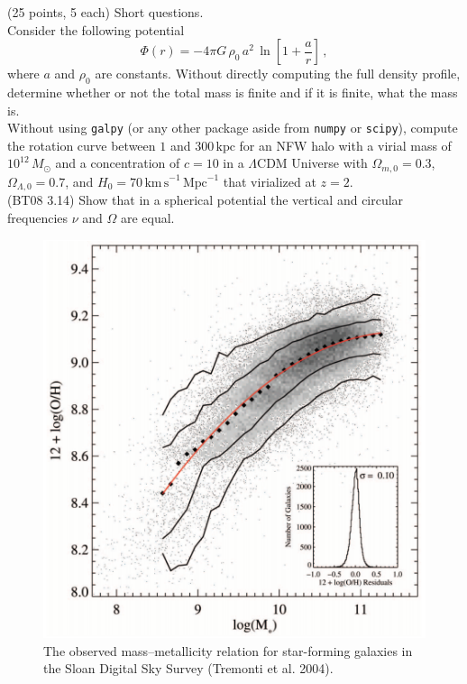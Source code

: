 \documentclass[12pt]{article}
\begin{document}
 (25 points, 5 each) Short questions.\\

 Consider the following potential
\begin{equation}
  \Phi(r) = -4\pi G\,\rho_0\,a^2\,\ln\left[1+\frac{a}{r}\right]\,,
\end{equation}
where $a$ and $\rho_0$ are constants. Without directly computing the
full density profile, determine whether or not the total mass is
finite and if it is finite, what the mass is.\\

 Without using \texttt{galpy} (or any other package
aside from \texttt{numpy} or \texttt{scipy}), compute the rotation
curve between $1$ and $300\,\mathrm{kpc}$ for an NFW halo with a
virial mass of $10^{12}\,M_\odot$ and a concentration of $c=10$ in a
$\Lambda$CDM Universe with $\Omega_{m,0} = 0.3$, $\Omega_{\Lambda,0}
= 0.7$, and $H_0 = 70\,\mathrm{km\,s}^{-1}\,\mathrm{Mpc}^{-1}$ that
virialized at $z=2$.\\

 (BT08 3.14) Show that in a spherical potential the
vertical and circular frequencies $\nu$ and $\Omega$ are equal.\\

\begin{figure}[htp]
\includegraphics[width=\textwidth]{tremonti.png}
\caption{The observed mass--metallicity relation for star-forming
  galaxies in the Sloan Digital Sky Survey (Tremonti et
  al. 2004).}\label{fig:tremonti}
\end{figure}
\end{document}
